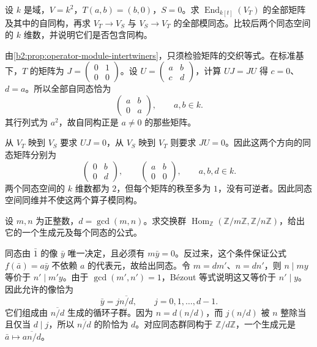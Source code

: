 \begin{exercise}\label{b2:ex:02-intertwiner}
	设 \(k\) 是域，\(V=k^2\)，\(T(a,b)=(b,0)\)，\(S=0\)。求 \(\operatorname{End}_{k[t]}(V_T)\) 的全部矩阵及其中的自同构，再求 \(V_T\to V_S\) 与 \(V_S\to V_T\) 的全部模同态。比较后两个同态空间的 \(k\) 维数，并说明它们是否包含同构。
\end{exercise}
\begin{solution}
	由\cref{b2:prop:operator-module-intertwiners}，只须检验矩阵的交织等式。在标准基下，\(T\) 的矩阵为 \(J=\begin{pmatrix}0&1\\0&0\end{pmatrix}\)。设 \(U=\begin{pmatrix}a&b\\c&d\end{pmatrix}\)，计算 \(UJ=JU\) 得 \(c=0\)、\(d=a\)。所以全部自同态恰为
	\[
		\begin{pmatrix}a&b\\0&a\end{pmatrix},\qquad a,b\in k.
	\]
	其行列式为 \(a^2\)，故自同构正是 \(a\ne0\) 的那些矩阵。

	从 \(V_T\) 映到 \(V_S\) 要求 \(UJ=0\)，从 \(V_S\) 映到 \(V_T\) 则要求 \(JU=0\)。因此这两个方向的同态矩阵分别为
	\[
		\begin{pmatrix}0&b\\0&d\end{pmatrix},\qquad
		\begin{pmatrix}a&b\\0&0\end{pmatrix},\qquad a,b,d\in k.
	\]
	两个同态空间的 \(k\) 维数都为 \(2\)，但每个矩阵的秩至多为 \(1\)，没有可逆者。因此同态空间同维并不使这两个算子模同构。
\end{solution}

\begin{exercise}\label{b2:ex:02-hom-cyclic}
	设 \(m,n\) 为正整数，\(d=\gcd(m,n)\)。求交换群 \(\operatorname{Hom}_{\mathbb Z}(\mathbb Z/m\mathbb Z,\mathbb Z/n\mathbb Z)\)，给出它的一个生成元及每个同态的公式。
\end{exercise}
\begin{solution}
	同态由 \(\bar1\) 的像 \(\bar y\) 唯一决定，且必须有 \(m\bar y=0\)。反过来，这个条件保证公式 \(f(\bar a)=a\bar y\) 不依赖 \(a\) 的代表元，故给出同态。令 \(m=dm'\)、\(n=dn'\)，则 \(n\mid my\) 等价于 \(n'\mid m'y\)。由于 \(\gcd(m',n')=1\)，Bézout 等式说明这又等价于 \(n'\mid y\)。因此允许的像恰为
	\[
		\bar y=j\overline{n/d},\qquad j=0,1,\ldots,d-1.
	\]
	它们组成由 \(\overline{n/d}\) 生成的循环子群。因为 \(n=d(n/d)\)，而 \(j(n/d)\) 被 \(n\) 整除当且仅当 \(d\mid j\)，所以 \(\overline{n/d}\) 的阶恰为 \(d\)。对应同态群同构于 \(\mathbb Z/d\mathbb Z\)，一个生成元是 \(\bar a\mapsto\overline{a n/d}\)。
\end{solution}

